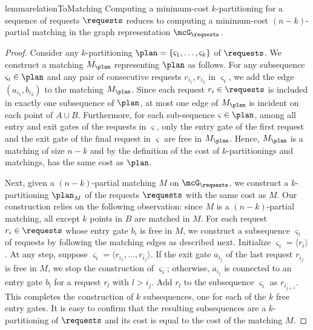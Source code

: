 %

%
%

\begin{restatable}{lemma}{relationToMatching}\label{lemma:relationToMatching}
    Computing a minimum-cost $k$-partitioning for a sequence of requests $\requests$ reduces to computing a minimum-cost $(n-k)$-partial matching in the graph representation $\mcG_\requests$.
\end{restatable}
\begin{proof}
Consider any $k$-partitioning $\plan=\{\varsigma_1,\ldots, \varsigma_k\}$ of $\requests$. We construct a matching $M_\plan$ representing $\plan$ as follows. For any subsequence $\varsigma_i\in \plan$ and any pair of consecutive requests $r_{i_1}, r_{i_2}$ in $\varsigma_i$, we add the edge $(a_{i_1}, b_{i_2})$ to the matching $M_\plan$. Since each request $r_i\in\requests$ is included in exactly one subsequence of $\plan$, at most one edge of $M_\plan$ is incident on each point of $A\cup B$. Furthermore, for each sub-sequence $\varsigma\in\plan$, among all entry and exit gates of the requests in $\varsigma$, only the entry gate of the first request and the exit gate of the final request in $\varsigma$ are free in $M_\plan$. Hence, $M_\plan$ is a matching of size $n-k$ and by the definition of the cost of $k$-partitionings and matchings, has the same cost as $\plan$.

Next, given a $(n-k)$-partial matching $M$ on $\mcG_\requests$, we construct a $k$-partitioning $\plan_M$ of the requests $\requests$ with the same cost as $M$. Our construction relies on the following observation: since $M$ is a $(n-k)$-partial matching, all except $k$ points in $B$ are matched in $M$. For each request $r_i\in\requests$ whose entry gate $b_i$ is free in $M$, we construct a subsequence $\varsigma_i$ of requests by following the matching edges as described next. Initialize $\varsigma_i=\langle r_i\rangle$. At any step, suppose $\varsigma_i=\langle r_{i_1}, \ldots, r_{i_j}\rangle$. If the exit gate $a_{i_j}$ of the last request $r_{i_j}$ is free in $M$, we stop the construction of $\varsigma_i$; otherwise, $a_{i_j}$ is connected to an entry gate $b_{l}$ for a request $r_{l}$ with $l>i_j$. Add $r_l$ to the subsequence $\varsigma_i$ as $r_{i_{j+1}}$. This completes the construction of $k$ subsequences, one for each of the $k$ free entry gates. It is easy to confirm that the resulting subsequences are a $k$-partitioning of $\requests$ and its cost is equal to the cost of the matching $M$.
\end{proof}


